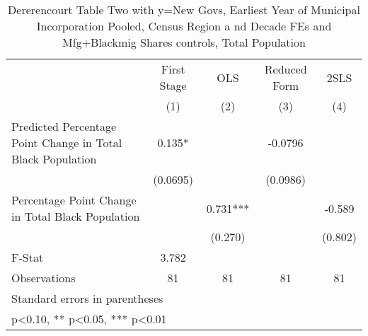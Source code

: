 \begin{table}[htbp]\centering
\def\sym#1{\ifmmode^{#1}\else\(^{#1}\)\fi}
\caption{Dererencourt Table Two with y=New Govs, Earliest Year of Municipal Incorporation  Pooled, Census Region a nd Decade FEs and Mfg+Blackmig Shares controls, Total Population}
\begin{tabular}{l*{4}{c}}
\toprule
                    & First Stage   &         OLS   &Reduced Form   &        2SLS   \\
                    &\multicolumn{1}{c}{(1)}   &\multicolumn{1}{c}{(2)}   &\multicolumn{1}{c}{(3)}   &\multicolumn{1}{c}{(4)}   \\
\midrule
Predicted Percentage Point Change in Total Black Population&       0.135*  &               &     -0.0796   &               \\
                    &    (0.0695)   &               &    (0.0986)   &               \\
\addlinespace
Percentage Point Change in Total Black Population&               &       0.731***&               &      -0.589   \\
                    &               &     (0.270)   &               &     (0.802)   \\
\midrule
F-Stat              &       3.782   &               &               &               \\
Observations        &          81   &          81   &          81   &          81   \\
\bottomrule
\multicolumn{5}{l}{\footnotesize Standard errors in parentheses}\\
\multicolumn{5}{l}{\footnotesize * p<0.10, ** p<0.05, *** p<0.01}\\
\end{tabular}
\end{table}
